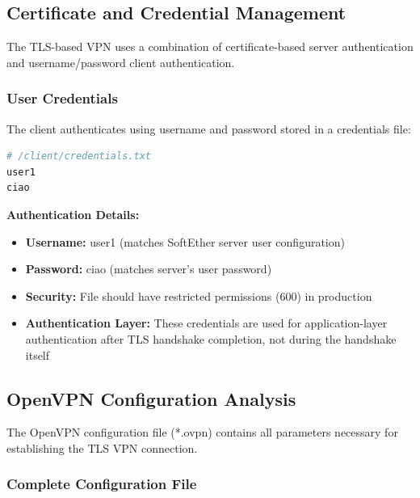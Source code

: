 \subsection{Certificate and Credential Management}

The TLS-based VPN uses a combination of certificate-based server authentication and username/password client authentication.

\subsubsection{User Credentials}

The client authenticates using username and password stored in a credentials file:

\begin{lstlisting}[language=bash]
# /client/credentials.txt
user1
ciao
\end{lstlisting}

\noindent
\textbf{Authentication Details:}
\begin{itemize}
    \item \textbf{Username:} user1 (matches SoftEther server user configuration)
    \item \textbf{Password:} ciao (matches server's user password)
    \item \textbf{Security:} File should have restricted permissions (600) in production
    \item \textbf{Authentication Layer:} These credentials are used for application-layer authentication after TLS handshake completion, not during the handshake itself
\end{itemize}

\subsection{OpenVPN Configuration Analysis}

The OpenVPN configuration file (*.ovpn) contains all parameters necessary for establishing the TLS VPN connection.

\subsubsection{Complete Configuration File}

